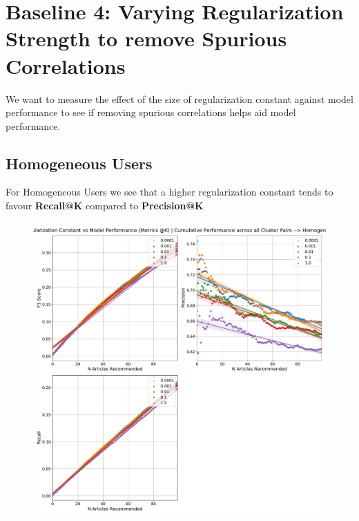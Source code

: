 \documentclass[a4paper,fontsize=9.0pt]{scrartcl}
\begin{document}
\vspace{20ex}
\section{Baseline 4: Varying Regularization Strength to remove Spurious Correlations}
\begin{flushleft}
We want to measure the effect of the size of regularization constant against model performance to see if removing spurious correlations helps aid model performance.

\subsection{Homogeneous Users}
\begin{flushleft}
For Homogeneous Users we see that a higher regularization constant tends to favour \textbf{Recall@K} compared to \textbf{Precision@K}
\end{flushleft}
\end{flushleft}
\begin{figure}[H]
 \centering
 \includegraphics[scale=0.4]{Graphs/regularization_vs_model_performance_cumu_Homogeneous.pdf}
\end{figure}
\end{document}
